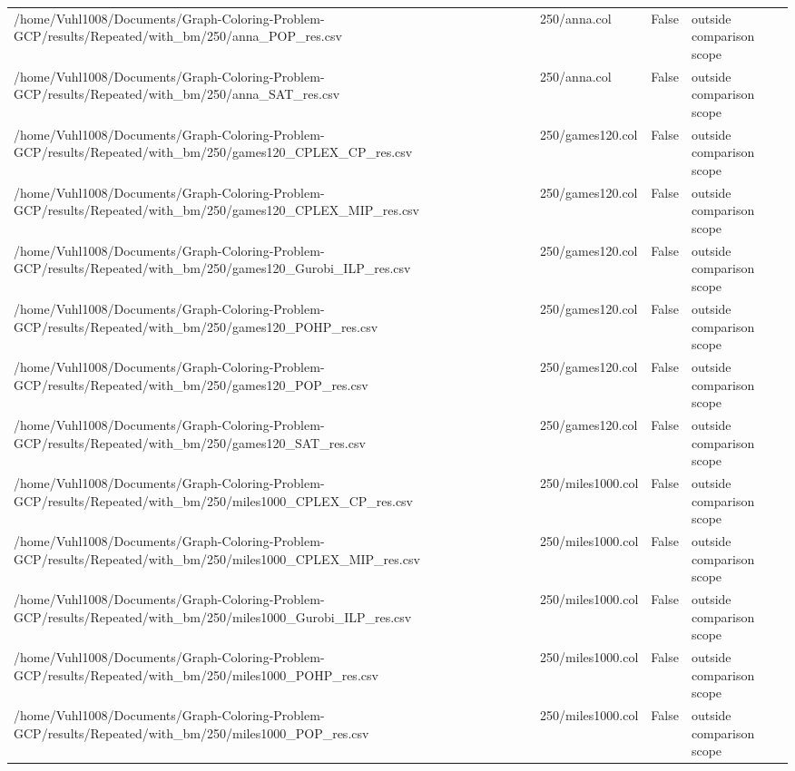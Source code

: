 \begin{table}[htbp]
\begin{tabular}{llll}
/home/Vuhl1008/Documents/Graph-Coloring-Problem-GCP/results/Repeated/with\_bm/250/anna\_POP\_res.csv & 250/anna.col & False & outside comparison scope \\
/home/Vuhl1008/Documents/Graph-Coloring-Problem-GCP/results/Repeated/with\_bm/250/anna\_SAT\_res.csv & 250/anna.col & False & outside comparison scope \\
/home/Vuhl1008/Documents/Graph-Coloring-Problem-GCP/results/Repeated/with\_bm/250/games120\_CPLEX\_CP\_res.csv & 250/games120.col & False & outside comparison scope \\
/home/Vuhl1008/Documents/Graph-Coloring-Problem-GCP/results/Repeated/with\_bm/250/games120\_CPLEX\_MIP\_res.csv & 250/games120.col & False & outside comparison scope \\
/home/Vuhl1008/Documents/Graph-Coloring-Problem-GCP/results/Repeated/with\_bm/250/games120\_Gurobi\_ILP\_res.csv & 250/games120.col & False & outside comparison scope \\
/home/Vuhl1008/Documents/Graph-Coloring-Problem-GCP/results/Repeated/with\_bm/250/games120\_POHP\_res.csv & 250/games120.col & False & outside comparison scope \\
/home/Vuhl1008/Documents/Graph-Coloring-Problem-GCP/results/Repeated/with\_bm/250/games120\_POP\_res.csv & 250/games120.col & False & outside comparison scope \\
/home/Vuhl1008/Documents/Graph-Coloring-Problem-GCP/results/Repeated/with\_bm/250/games120\_SAT\_res.csv & 250/games120.col & False & outside comparison scope \\
/home/Vuhl1008/Documents/Graph-Coloring-Problem-GCP/results/Repeated/with\_bm/250/miles1000\_CPLEX\_CP\_res.csv & 250/miles1000.col & False & outside comparison scope \\
/home/Vuhl1008/Documents/Graph-Coloring-Problem-GCP/results/Repeated/with\_bm/250/miles1000\_CPLEX\_MIP\_res.csv & 250/miles1000.col & False & outside comparison scope \\
/home/Vuhl1008/Documents/Graph-Coloring-Problem-GCP/results/Repeated/with\_bm/250/miles1000\_Gurobi\_ILP\_res.csv & 250/miles1000.col & False & outside comparison scope \\
/home/Vuhl1008/Documents/Graph-Coloring-Problem-GCP/results/Repeated/with\_bm/250/miles1000\_POHP\_res.csv & 250/miles1000.col & False & outside comparison scope \\
/home/Vuhl1008/Documents/Graph-Coloring-Problem-GCP/results/Repeated/with\_bm/250/miles1000\_POP\_res.csv & 250/miles1000.col & False & outside comparison scope \\

\end{tabular}
\end{table}
